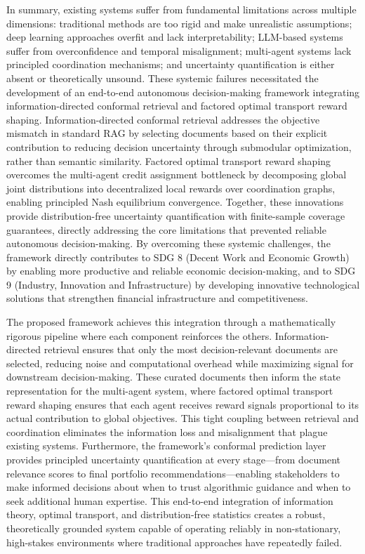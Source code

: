 \documentclass[12pt,a4paper,oneside]{report}
\theoremstyle{definition}
\theoremstyle{remark}
\begin{document}
In summary, existing systems suffer from fundamental limitations across multiple dimensions: traditional methods are too rigid and make unrealistic assumptions; deep learning approaches overfit and lack interpretability; LLM-based systems suffer from overconfidence and temporal misalignment; multi-agent systems lack principled coordination mechanisms; and uncertainty quantification is either absent or theoretically unsound. These systemic failures necessitated the development of an end-to-end autonomous decision-making framework integrating information-directed conformal retrieval and factored optimal transport reward shaping. Information-directed conformal retrieval addresses the objective mismatch in standard RAG by selecting documents based on their explicit contribution to reducing decision uncertainty through submodular optimization, rather than semantic similarity. Factored optimal transport reward shaping overcomes the multi-agent credit assignment bottleneck by decomposing global joint distributions into decentralized local rewards over coordination graphs, enabling principled Nash equilibrium convergence. Together, these innovations provide distribution-free uncertainty quantification with finite-sample coverage guarantees, directly addressing the core limitations that prevented reliable autonomous decision-making. By overcoming these systemic challenges, the framework directly contributes to SDG 8 (Decent Work and Economic Growth) by enabling more productive and reliable economic decision-making, and to SDG 9 (Industry, Innovation and Infrastructure) by developing innovative technological solutions that strengthen financial infrastructure and competitiveness.

The proposed framework achieves this integration through a mathematically rigorous pipeline where each component reinforces the others. Information-directed retrieval ensures that only the most decision-relevant documents are selected, reducing noise and computational overhead while maximizing signal for downstream decision-making. These curated documents then inform the state representation for the multi-agent system, where factored optimal transport reward shaping ensures that each agent receives reward signals proportional to its actual contribution to global objectives. This tight coupling between retrieval and coordination eliminates the information loss and misalignment that plague existing systems. Furthermore, the framework's conformal prediction layer provides principled uncertainty quantification at every stage—from document relevance scores to final portfolio recommendations—enabling stakeholders to make informed decisions about when to trust algorithmic guidance and when to seek additional human expertise. This end-to-end integration of information theory, optimal transport, and distribution-free statistics creates a robust, theoretically grounded system capable of operating reliably in non-stationary, high-stakes environments where traditional approaches have repeatedly failed.
\end{document}
